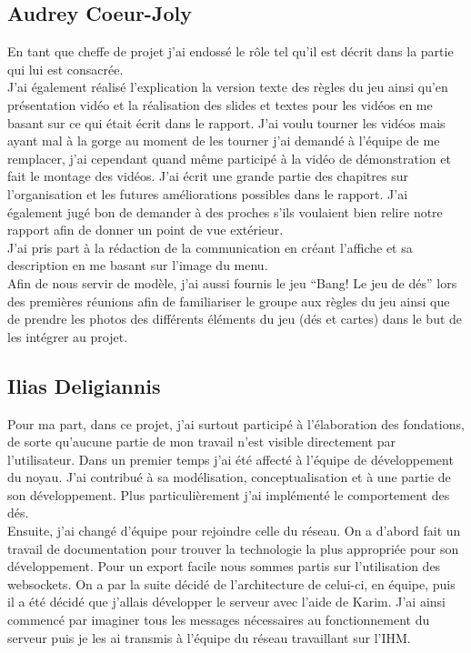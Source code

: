 \documentclass[a4paper,11pt]{article}
\begin{document}
\subsection{Audrey Coeur-Joly}



	En tant que cheffe de projet j’ai endossé le rôle tel qu’il est décrit dans la partie qui lui est consacrée.\\ 

	J’ai également réalisé l’explication la version texte des règles du jeu ainsi qu’en présentation vidéo et la réalisation des slides et textes pour les vidéos en me basant sur ce qui était écrit dans le rapport. J’ai voulu tourner les vidéos mais ayant mal à la gorge au moment de les tourner j’ai demandé à l’équipe de me remplacer, j’ai cependant quand même participé à la vidéo de démonstration et fait le montage des vidéos. J’ai écrit une grande partie des chapitres sur l’organisation et les futures améliorations possibles dans le rapport. J’ai également jugé bon de demander à des proches s’ils voulaient bien relire notre rapport afin de donner un point de vue extérieur. \\
	
	J’ai pris part à la rédaction de la communication en créant l’affiche et sa description en me basant sur l’image du menu. \\

	Afin de nous servir de modèle, j’ai aussi fournis le jeu “Bang! Le jeu de dés” lors des premières réunions afin de familiariser le groupe aux règles du jeu ainsi que de prendre les photos des différents éléments du jeu (dés et cartes) dans le but de les intégrer au projet. \\


\subsection{Ilias Deligiannis}

	Pour ma part, dans ce projet, j’ai surtout participé à l'élaboration des fondations, de sorte qu'aucune partie de mon travail n’est visible directement par l’utilisateur. Dans un premier temps j’ai été affecté à l’équipe de développement du noyau. J’ai contribué à sa modélisation, conceptualisation et à une partie de son développement. Plus particulièrement j’ai implémenté le comportement des dés.  \\

    Ensuite, j’ai changé d’équipe pour rejoindre celle du réseau. On a d’abord fait un travail de documentation pour trouver la technologie la plus appropriée pour son développement. Pour un export facile nous sommes partis sur l’utilisation des websockets. On a par la suite décidé de l'architecture de celui-ci, en équipe, puis il a été décidé que j’allais développer le serveur avec l’aide de Karim. J’ai ainsi commencé par imaginer tous les messages nécessaires au fonctionnement du serveur puis je les ai transmis à l’équipe du réseau travaillant sur l’IHM. \\
\end{document}
